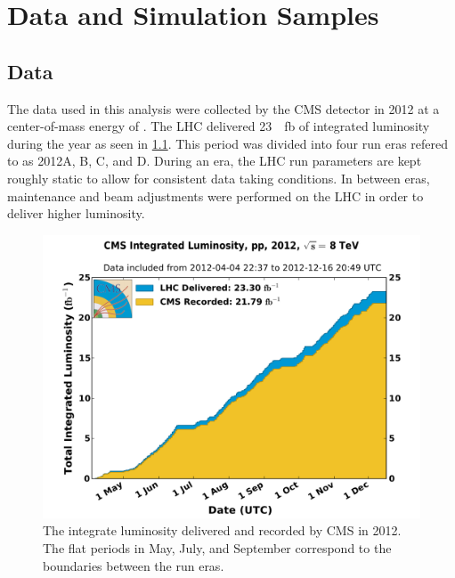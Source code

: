\chapter{Data and Simulation Samples}
\label{chatper:data_and_mc_samples}

\section{Data}

The data used in this analysis were collected by the CMS detector in 2012 at a
center-of-mass energy of \rootseight. The LHC delivered
\SI{23}{\per\femto\barn} of integrated luminosity during the year as seen in
\cref{fig:2012_luminosity}. This period was divided into four run eras refered
to as 2012A, B, C, and D. During an era, the LHC run parameters are kept
roughly static to allow for consistent data taking conditions. In between eras,
maintenance and beam adjustments were performed on the LHC in order to deliver
higher luminosity.

\begin{figure}[!htbp]
    \centering
    \includegraphics[width=\textwidth]{figures/2012_lumi.pdf}
    \caption[
        The integrate luminosity delivered and recorded by CMS in 2012
    ]{
        The integrate luminosity delivered and recorded by CMS in 2012. The
        flat periods in May, July, and September correspond to the boundaries
        between the run eras.
    }
    \label{fig:2012_luminosity}
\end{figure}

